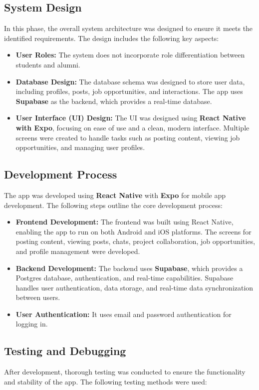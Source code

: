 \documentclass[12pt, a4paper]{report}
\begin{document}
\subsection{System Design}
In this phase, the overall system architecture was designed to ensure it meets the identified requirements. The design includes the following key aspects:

\begin{itemize}
    \item \textbf{User Roles:} The system does not incorporate role differentiation between students and alumni.
    \item \textbf{Database Design:} The database schema was designed to store user data, including profiles, posts, job opportunities, and interactions. The app uses \textbf{Supabase} as the backend, which provides a real-time database.
    \item \textbf{User Interface (UI) Design:} The UI was designed using \textbf{React Native with Expo}, focusing on ease of use and a clean, modern interface. Multiple screens were created to handle tasks such as posting content, viewing job opportunities, and managing user profiles.
\end{itemize}

\subsection{Development Process}
The app was developed using \textbf{React Native} with \textbf{Expo} for mobile app development. The following steps outline the core development process:

\begin{itemize}
    \item \textbf{Frontend Development:} The frontend was built using React Native, enabling the app to run on both Android and iOS platforms. The screens for posting content, viewing posts, chats, project collaboration, job opportunities, and profile management were developed.
    \item \textbf{Backend Development:} The backend uses \textbf{Supabase}, which provides a Postgres database, authentication, and real-time capabilities. Supabase handles user authentication, data storage, and real-time data synchronization between users.
    \item \textbf{User Authentication:} It uses email and password authentication for logging in.
\end{itemize}

\subsection{Testing and Debugging}
After development, thorough testing was conducted to ensure the functionality and stability of the app. The following testing methods were used:
\end{document}
